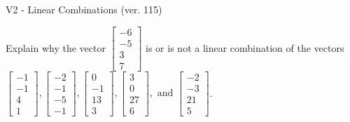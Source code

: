 \begin{exercise}
  \begin{exerciseTitle}V2 - Linear Combinations (ver. 115)\end{exerciseTitle}
  \begin{exerciseStatement}
    Explain why the vector \(\left[\begin{array}{c}
-6 \\
-5 \\
3 \\
7
\end{array}\right]\)  is or is not a linear 
	combination of the vectors \(\left[\begin{array}{c}
-1 \\
-1 \\
4 \\
1
\end{array}\right] , \left[\begin{array}{c}
-2 \\
-1 \\
-5 \\
-1
\end{array}\right] , \left[\begin{array}{c}
0 \\
-1 \\
13 \\
3
\end{array}\right] , \left[\begin{array}{c}
3 \\
0 \\
27 \\
6
\end{array}\right] , \text{ and } \left[\begin{array}{c}
-2 \\
-3 \\
21 \\
5
\end{array}\right]\).
	



\end{exerciseStatement}
\end{exercise}
